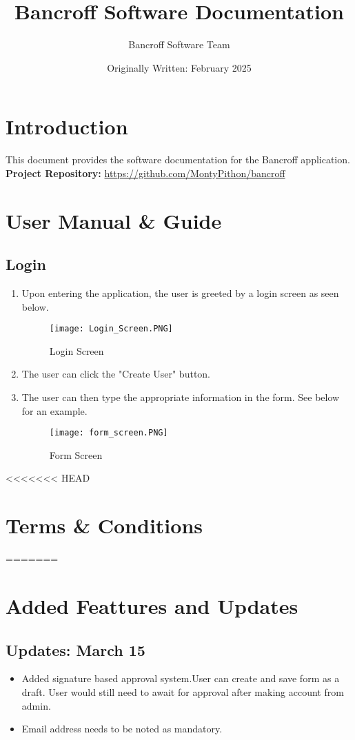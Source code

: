 \documentclass{article}
\title{Bancroff Software Documentation}
\author{Bancroff Software Team}
\date{Originally Written: February 2025}
\begin{document}
\maketitle

\section{Introduction}
This document provides the software documentation for the Bancroff application.\\[1ex]
\textbf{Project Repository:} \url{https://github.com/MontyPithon/bancroff}

\section{User Manual \& Guide}
    \subsection{Login}
        \begin{enumerate}
            \item Upon entering the application, the user is greeted by a login screen as seen below.
                \begin{figure}[h]
                \centering
                \texttt{[image: Login\_Screen.PNG]}
                \caption{Login Screen}
                \end{figure}
            \item The user can click the "Create User" button.
            \item The user can then type the appropriate information in the form. See below for an example.
                \begin{figure}[h]
                \centering
                \texttt{[image: form\_screen.PNG]}
                \caption{Form Screen}
                \end{figure}
        \end{enumerate}
<<<<<<< HEAD
        
\section{Terms \& Conditions}
=======
    \section{Added Feattures and Updates}
        \subsection{Updates: March 15}
            \begin{itemize}
                \item
                    Added signature based approval system.User can create and save form as a draft.
                    User would still need to await for approval after making account from admin.
                \item
                    Email address needs to be noted as mandatory.
            \end{itemize}
\end{document}
